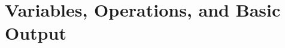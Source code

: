 \documentclass{book}
\newcommand{\python}[3]{
    \usemintedstyle{autumn}
    \begin{listing}[ht]
        \begin{mdframed}[backgroundcolor=codebg]
            \inputminted[linenos]{python}{#1}
        \end{mdframed}
        \caption{#2}
        \label{#3}
    \end{listing}
}
\newcommand{\pythonNLN}[3]{
    \usemintedstyle{autumn}
    \begin{listing}[htb]
        \begin{mdframed}[backgroundcolor=codebg]
            \inputminted{python}{#1}
        \end{mdframed}
        \caption{#2}
        \label{#3}
    \end{listing}
}
\newcommand{\shell}[3]{
    \begin{listing}[htb]
        \begin{mdframed}[backgroundcolor=codebg]
              
        \end{mdframed}
        \caption{#2}
        \label{#3}
    \end{listing}
}
\begin{document}
%
%
%
%       
%
%
%


\chapter{Variables, Operations, and Basic Output}
\end{document}
